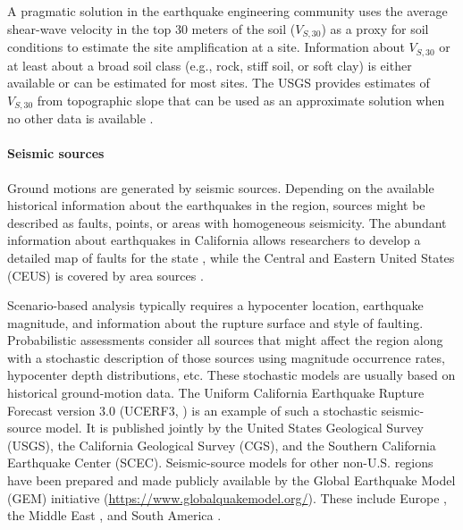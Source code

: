 A pragmatic solution in the earthquake engineering community uses the average shear-wave velocity in the top 30 meters of the soil ($V_{S,30}$) as a proxy for soil conditions to estimate the site amplification at a site. Information about $V_{S,30}$ or at least about a broad soil class (e.g., rock, stiff soil, or soft clay) is either available or can be estimated for most sites. The USGS provides estimates of $V_{S,30}$ from topographic slope that can be used as an approximate solution when no other data is available \citep{usgs2020vs30}. 

\paragraph{Seismic sources} Ground motions are generated by seismic sources. Depending on the available historical information about the earthquakes in the region, sources might be described as faults, points, or areas with homogeneous seismicity. The abundant information about earthquakes in California allows researchers to develop a detailed map of faults for the state \citep{field2014uniform}, while the Central and Eastern United States (CEUS) is covered by area sources \citep{mueller2015seismic}.

Scenario-based analysis typically requires a hypocenter location, earthquake magnitude, and information about the rupture surface and style of faulting. Probabilistic assessments consider all sources that might affect the region along with a stochastic description of those sources using magnitude occurrence rates, hypocenter depth distributions, etc. These stochastic models are usually based on historical ground-motion data. The Uniform California Earthquake Rupture Forecast version 3.0 (UCERF3, \cite{field2014uniform}) is an example of such a stochastic seismic-source model. It is published jointly by the United States Geological Survey (USGS), the California Geological Survey (CGS), and the Southern California Earthquake Center (SCEC). Seismic-source models for other non-U.S. regions have been prepared and made publicly available by the Global Earthquake Model (GEM) initiative (\url{https://www.globalquakemodel.org/}). These include Europe \citep{giardini2014mapping}, the Middle East \citep{danciu20172014}, and South America \citep{garcia2018creation}.


